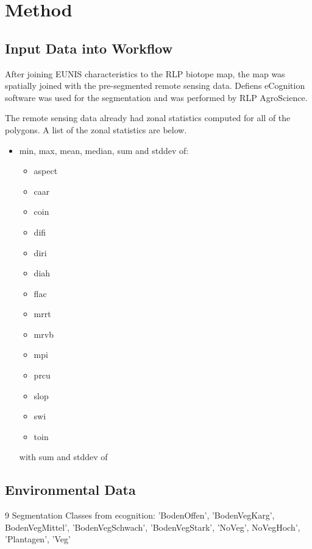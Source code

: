 \documentclass[authoryear, review,12pt,number]{elsarticle}
\begin{document}
\section{Method}
\subsection{Input Data into Workflow}
After joining EUNIS characteristics to the RLP biotope map, the map was 
spatially joined with the pre-segmented remote sensing data. Defiens eCognition
software was used for the segmentation and was performed by RLP AgroScience. 

The remote sensing data already had zonal statistics computed for all of the
polygons. A list of the zonal statistics are below.
\begin{itemize}
  \item min, max, mean, median, sum and stddev of:
  \begin{itemize}
    \item aspect
    \item caar
	\item coin
	\item difi
	\item diri
	\item diah
	\item flac
	\item mrrt
	\item mrvb
	\item mpi
	\item prcu
	\item slop
	\item swi
	\item toin
  \end{itemize}with  sum and stddev of 
\end{itemize}


\subsection{Environmental Data}

9 Segmentation Classes from ecognition:
'BodenOffen', 'BodenVegKarg', BodenVegMittel', 'BodenVegSchwach',
'BodenVegStark', 'NoVeg', NoVegHoch', 'Plantagen', 'Veg'
\end{document}
